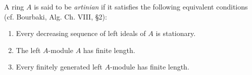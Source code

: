 A ring $A$ is said to be \emph{artinian} if it satisfies the following equivalent conditions (cf. Bourbaki, Alg. Ch. VIII, \S 2):

\begin{enumerate}
\item[(a)] Every decreasing sequence of left ideals of $A$ is stationary.
\item[(b)] The left $A$-module $A$ has finite length.
\item[(c)] Every finitely generated left $A$-module has finite length.
\end{enumerate}
